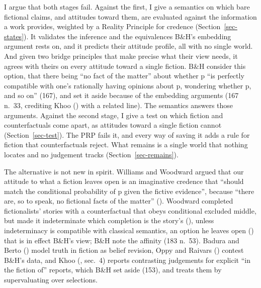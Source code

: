 \documentclass[
  11pt,
  letterpaper,
  DIV=11,
  numbers=noendperiod,
  twoside]{scrartcl}
\begin{document}
I argue that both stages fail. Against the first, I give a semantics on
which bare fictional claims, and attitudes toward them, are evaluated
against the information a work provides, weighted by a Reality Principle
for credence (Section~\ref{sec-states}). It validates the inference and
the equivalences B\&H's embedding argument rests on, and it predicts
their attitude profile, all with no single world. And given two bridge
principles that make precise what their view needs, it agrees with
theirs on every attitude toward a single fiction. B\&H consider this
option, that there being ``no fact of the matter'' about whether p ``is
perfectly compatible with one's rationally having opinions about p,
wondering whether p, and so on'' (167), and set it aside because of the
embedding arguments (167 n.~33, crediting Khoo
() with a related line). The semantics
answers those arguments. Against the second stage, I give a test on
which fiction and counterfactuals come apart, as attitudes toward a
single fiction cannot (Section~\ref{sec-test}). The PRP fails it, and
every way of saving it adds a rule for fiction that counterfactuals
reject. What remains is a single world that nothing locates and no
judgement tracks (Section~\ref{sec-remains}).

The alternative is not new in spirit. Williams and Woodward argued that
our attitude to what a fiction leaves open is an imaginative credence
that ``should match the conditional probability of p given the fictive
evidence'', because ``there are, so to speak, no fictional facts of the
matter'' (). Woodward completed fictionalists' stories with a
counterfactual that obeys conditional excluded middle, but made it
indeterminate which completion is the story's
(), unless indeterminacy
is compatible with classical semantics, an option he leaves open
() that is in effect B\&H's view;
B\&H note the affinity (183 n.~53). Badura and Berto
() model truth in fiction as belief
revision, Oppy and Raivars ()
contest B\&H's data, and Khoo (,
sec.~4) reports contrasting judgements for explicit ``in the fiction
of'' reports, which B\&H set aside (153), and treats them by
supervaluating over selections.
\end{document}
